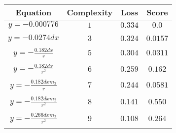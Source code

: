 \documentclass{article}
\begin{document}
\begin{table}[h]
\begin{center}
\begin{tabular}{@{}cccc@{}}
\toprule
Equation & Complexity & Loss & Score \\
\midrule
$y = -0.000776$ & $1$ & $0.334$ & $0.0$ \\ \\
$y = - 0.0274 dx$ & $3$ & $0.324$ & $0.0157$ \\ \\
$y = - \frac{0.182 dx}{r}$ & $5$ & $0.304$ & $0.0311$ \\ \\
$y = - \frac{0.182 dx}{r^{2}}$ & $6$ & $0.259$ & $0.162$ \\ \\
$y = - \frac{0.182 dx m_{2}}{r}$ & $7$ & $0.244$ & $0.0581$ \\ \\
$y = - \frac{0.182 dx m_{2}}{r^{2}}$ & $8$ & $0.141$ & $0.550$ \\ \\ %
$y = - \frac{0.266 dx m_{2}}{r^{2}}$ & $9$ & $0.108$ & $0.264$ \\ \\
\bottomrule
\end{tabular}
\end{center}
\end{table}
\end{document}
